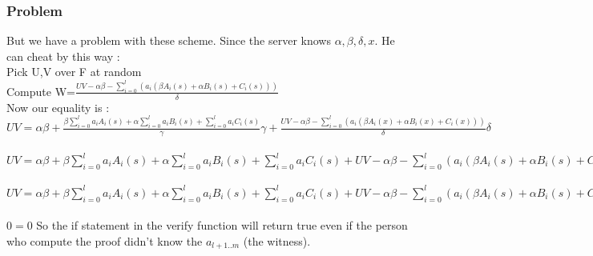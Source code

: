 \subsubsection{Problem}
\label{sec:ProblemWithoutZK}
But we have a problem with these scheme. Since the server knows $\alpha, \beta,\delta,x$. He can cheat by this way :
\\Pick U,V over F at random
\\Compute W=$\frac{UV-\alpha\beta-\sum_{i=0}^l(a_i(\beta A_i(s) + \alpha B_i(s) + C_i(s)))}{\delta}$
\\Now our equality is :
\\$UV = \alpha \beta + \frac{\beta \sum_{i=0}^{l} a_i A_i(s) + \alpha \sum_{i=0}^{l} a_i B_i(s) + \sum_{i=0}^{l} a_i C_i(s)}{\gamma} \gamma +  \frac{UV-\alpha\beta-\sum_{i=0}^l(a_i(\beta A_i(x) + \alpha B_i(x) + C_i(x)))}{\delta}\delta $
\\
\\$UV = \alpha \beta + \beta \sum_{i=0}^{l} a_i A_i(s) + \alpha \sum_{i=0}^{l} a_i B_i(s) + \sum_{i=0}^{l} a_i C_i(s) +  UV-\alpha\beta-\sum_{i=0}^l(a_i(\beta A_i(s) + \alpha B_i(s) + C_i(s)))$
\\
\\$UV = \alpha \beta + \beta \sum_{i=0}^{l} a_i A_i(s) + \alpha \sum_{i=0}^{l} a_i B_i(s) + \sum_{i=0}^{l} a_i C_i(s) +  UV-\alpha\beta-\sum_{i=0}^l(a_i(\beta A_i(s) + \alpha B_i(s) + C_i(s)))$
\\
\\$0 = 0$
So the if statement in the verify function will return true even if the person who compute the proof didn't know the $a_{l+1..m}$ (the witness).